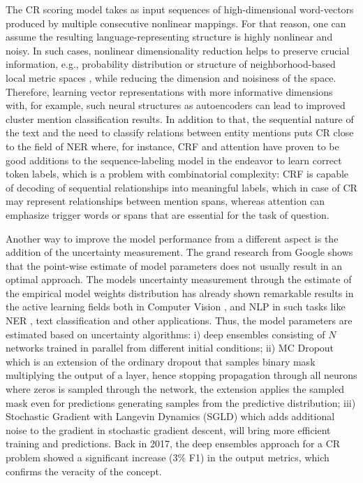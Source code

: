 The CR scoring model takes as input sequences of high-dimensional word-vectors produced by multiple consecutive nonlinear mappings. For that reason, one can assume the resulting language-representing structure is highly nonlinear and noisy. 
In such cases, nonlinear dimensionality reduction helps to preserve crucial information, e.g., probability distribution \cite{dr-VanderMaaten2014} or structure of neighborhood-based local metric spaces \cite{dr-McInnes2018}, while reducing the dimension and noisiness of the space. 
Therefore, learning vector representations with more informative dimensions with, for example, such neural structures as autoencoders \cite{autoencoders-Zabalza2016,autoencoders-Sahay2019} can lead to improved cluster mention classification results. 
In addition to that, the sequential nature of the text and the need to classify relations between entity mentions puts CR close to the field of NER where, for instance, CRF \cite{ner-Strakova2019,ner-Zhanming2019} and attention \cite{ner-Yamada2020,translation-Bahdanau2014} have proven to be good additions to the sequence-labeling model in the endeavor to learn correct token labels, which is a problem with combinatorial complexity: CRF is capable of decoding of sequential relationships into meaningful labels, which in case of CR may represent relationships between mention spans, whereas attention can emphasize trigger words or spans that are essential for the task of question.

Another way to improve the model performance from a different aspect is the addition of the uncertainty measurement. 
The grand research from Google \cite{ovadia2019can} shows that the point-wise estimate of model parameters does not usually result in an optimal approach. 
The models uncertainty measurement through the estimate of the empirical model weights distribution has already shown remarkable results in the active learning fields both in Computer Vision \cite{gal2017deep}, and NLP in such tasks like NER \cite{shen2017deep, lowell2018practical}, text classification \cite{an2018deep} and other applications. 
Thus, the model parameters are estimated based on uncertainty algorithms: i) deep ensembles \cite{lakshminarayanan2016simple} consisting of $N$ networks trained in parallel from different initial conditions; ii) MC Dropout \cite{gal2017deep} which is an extension of the ordinary dropout that samples binary mask multiplying the output of a layer, hence stopping propagation through all neurons where zeros is sampled through the network, the extension applies the sampled mask even for predictions generating samples from the predictive distribution; iii) Stochastic Gradient with Langevin Dynamics (SGLD) \cite{welling2011bayesian} which adds additional noise to the gradient in stochastic gradient descent, will bring more efficient training and predictions. 
Back in 2017, the deep ensembles approach for a CR problem \cite{cr-Lee17} showed a significant increase (3\% F1) in the output metrics, which confirms the veracity of the concept.

